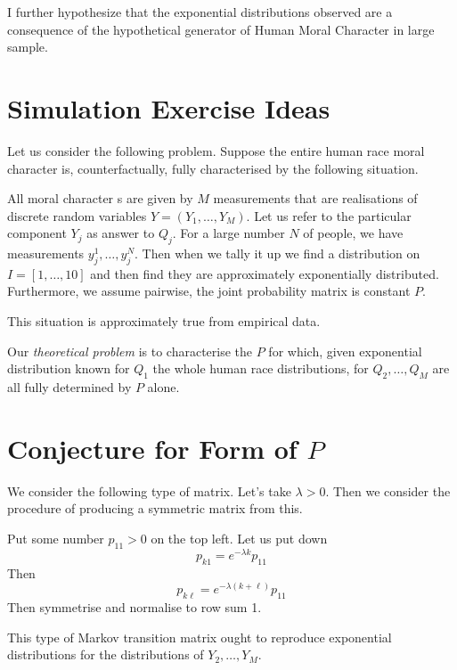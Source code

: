\documentclass{amsart}
\begin{document}
I further hypothesize that the exponential distributions observed are a consequence of the hypothetical generator of Human Moral Character in large sample.

\section{Simulation Exercise Ideas}

Let us consider the following problem.  Suppose the entire human race moral character is, counterfactually, fully characterised by the following situation.

All moral character s are given by $M$ measurements that are realisations of discrete random variables $Y = (Y_1, \dots, Y_M)$.  Let us refer to the particular component $Y_j$ as answer to $Q_j$.  For a large number $N$ of people, we have measurements $y^1_j,\dots, y^N_j$.  Then when we tally it up we find a distribution on $I=[1,\dots, 10]$ and then find they are approximately exponentially distributed.  Furthermore, we assume pairwise, the joint probability matrix is constant $P$.

This situation is approximately true from empirical data.  

Our {\em theoretical problem} is to characterise the $P$ for which, given exponential distribution known for $Q_1$ the whole human race distributions, for $Q_2, \dots, Q_M$ are all fully determined by $P$ alone.

\section{Conjecture for Form of $P$}

We consider the following type of matrix.  Let's take $\lambda>0$.  Then we consider the procedure of producing a symmetric matrix from this.

Put some number $p_{11}>0$ on the top left.  Let us put down 
\[
p_{k1} = e^{-\lambda k}p_{11}
\]
Then
\[
p_{k\ell} = e^{-\lambda(k+\ell)}p_{11}
\]
Then symmetrise and normalise to row sum 1.

This type of Markov transition matrix ought to reproduce exponential distributions for the distributions of $Y_2,\dots, Y_M$.  
\end{document}
